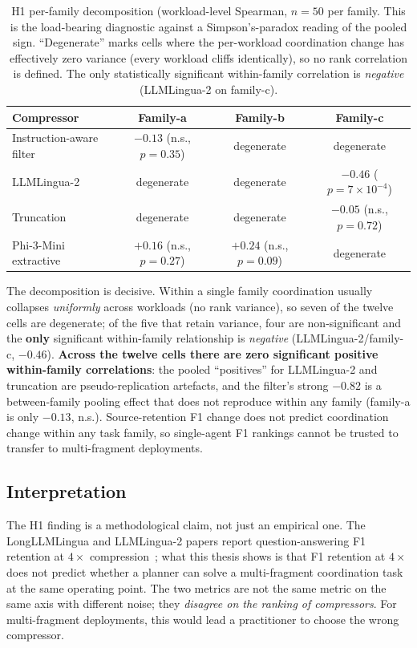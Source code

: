 \begin{table}[htbp]
\centering
\caption{H1 per-family decomposition (workload-level Spearman,
$n=50$ per family. This is the
load-bearing diagnostic against a Simpson's-paradox reading of the
pooled sign. ``Degenerate'' marks cells where the per-workload
coordination change has effectively zero variance (every workload
cliffs identically), so no rank correlation is defined. The only
statistically significant within-family correlation is
\emph{negative} (LLMLingua-2 on family-c).}
\label{tab:h1_perfamily}
\small
\begin{tabular}{lccc}
\hline
Compressor & Family-a & Family-b & Family-c \\
\hline
Instruction-aware filter & $-0.13$ (n.s., $p=0.35$) & degenerate & degenerate \\
LLMLingua-2              & degenerate              & degenerate & $-0.46$ ($p=7\!\times\!10^{-4}$) \\
Truncation               & degenerate              & degenerate & $-0.05$ (n.s., $p=0.72$) \\
Phi-3-Mini extractive    & $+0.16$ (n.s., $p=0.27$) & $+0.24$ (n.s., $p=0.09$) & degenerate \\
\hline
\end{tabular}
\end{table}

The decomposition is decisive. Within a single family coordination
usually collapses \emph{uniformly} across workloads (no rank
variance), so seven of the twelve cells are degenerate; of the five
that retain variance, four are non-significant and the \textbf{only}
significant within-family relationship is \emph{negative}
(LLMLingua-2/family-c, $-0.46$). \textbf{Across the twelve cells
there are zero significant positive within-family correlations}: the
pooled ``positives'' for LLMLingua-2 and truncation are
pseudo-replication artefacts, and the filter's strong $-0.82$ is a
between-family pooling effect that does not reproduce within any
family (family-a is only $-0.13$, n.s.). Source-retention F1 change does not predict coordination change within
any task family, so single-agent F1 rankings cannot be trusted to
transfer to multi-fragment deployments.

\subsection{Interpretation}

The H1 finding is a methodological claim, not just an empirical
one. The LongLLMLingua and LLMLingua-2 papers report
question-answering F1 retention at $4\times$
compression~\cite{jiang2024longllmlingua, pan2024llmlingua2}; what
this thesis shows is that F1 retention at $4\times$ does not
predict whether a planner can solve a multi-fragment coordination
task at the same operating point. The two metrics are not the
same metric on the same axis with different noise; they
\emph{disagree on the ranking of compressors}. For
multi-fragment deployments, this would lead a practitioner to choose the wrong compressor.

